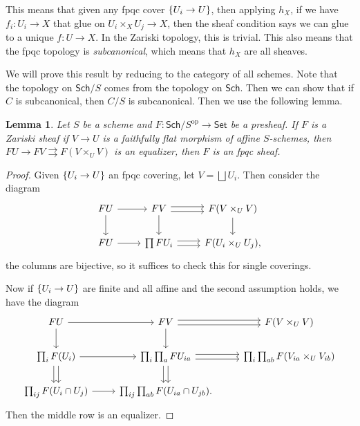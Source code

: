 \documentclass[leqno, openany]{memoir}
\newtheorem{lem}[thm]{Lemma}
\theoremstyle{definition}
\theoremstyle{remark}
\theoremstyle{plain}
\theoremstyle{definition}
\theoremstyle{remark}
\newcommand{\mr}[1]{\mathrm{#1}}
\newcommand{\ms}[1]{\mathsf{#1}}
\begin{document}
This means that given any fpqc cover $\qty{U_i \to U}$, then applying $h_X$, if we have $f_i \colon U_i \to X$ that glue on $U_i \times_X U_j \to X$, then the sheaf condition says we can glue to a unique $f \colon U \to X$. In the Zariski topology, this is trivial. This also means that the fpqc topology is \textit{subcanonical}, which means that $h_X$ are all sheaves.

    We will prove this result by reducing to the category of all schemes. Note that the topology on $\ms{Sch}/S$ comes from the topology on $\ms{Sch}$. Then we can show that if $C$ is subcanonical, then $C/S$ is subcanonical. Then we use the following lemma.

\begin{lem}
    Let $S$ be a scheme and $F \colon \ms{Sch}/S^{\mr{op}} \to \ms{Set}$ be a presheaf. If $F$ is a Zariski sheaf if $V \to U$ is a faithfully flat morphism of affine $S$-schemes, then $FU \to FV \rightrightarrows F(V \times_U V)$ is an equalizer, then $F$ is an fpqc sheaf.
\end{lem}

\begin{proof}
    Given $\qty{U_i \to U}$ an fpqc covering, let $V = \bigsqcup U_i$. Then consider the diagram
    \begin{equation*}
    \begin{tikzcd}
        FU \arrow{r} \arrow{d} & FV \arrow[shift left=1]{r} \arrow[shift right=1]{r} \arrow{d} & F(V \times_U V) \arrow{d} \\
        FU \arrow{r} & \prod FU_i \arrow[shift left=1]{r} \arrow[shift right=1]{r} & F(U_i \times_U U_j),
    \end{tikzcd}
    \end{equation*}
    the columns are bijective, so it suffices to check this for single coverings.   

    Now if $\qty{U_i \to U}$ are finite and all affine and the second assumption holds, we have the diagram
    \begin{equation*}
    \begin{tikzcd}
        FU \arrow{r} \arrow{d} & FV \arrow{d} \arrow[shift left=1]{r} \arrow[shift right = 1]{r} & F(V \times_U V) \\
        \prod_i F(U_i) \arrow{r} \arrow[shift left=1]{d} \arrow[shift right = 1]{d} & \prod_i \prod_a FU_{ia} \arrow[shift left=1]{r} \arrow[shift right = 1]{r}\arrow[shift left=1]{d} \arrow[shift right = 1]{d} & \prod_i \prod_{ab} F(V_{ia} \times_U V_{ib}) \\
        \prod_{ij} F(U_i \cap U_j) \arrow{r} & \prod_{ij} \prod_{ab} F(U_{ia} \cap U_{jb}).
    \end{tikzcd}
    \end{equation*}
    Then the middle row is an equalizer. 
\end{proof}
\end{document}
